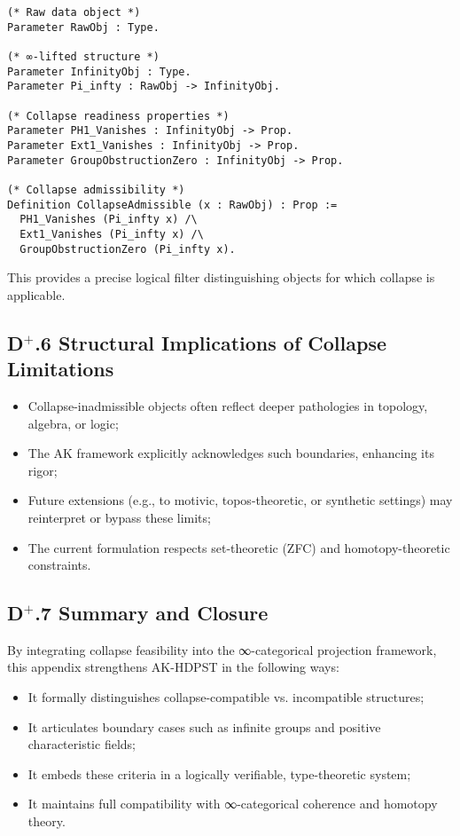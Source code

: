 \documentclass[11pt]{article}
\begin{document}
\begin{lstlisting}[language=Coq, mathescape=false]
(* Raw data object *)
Parameter RawObj : Type.

(* ∞-lifted structure *)
Parameter InfinityObj : Type.
Parameter Pi_infty : RawObj -> InfinityObj.

(* Collapse readiness properties *)
Parameter PH1_Vanishes : InfinityObj -> Prop.
Parameter Ext1_Vanishes : InfinityObj -> Prop.
Parameter GroupObstructionZero : InfinityObj -> Prop.

(* Collapse admissibility *)
Definition CollapseAdmissible (x : RawObj) : Prop :=
  PH1_Vanishes (Pi_infty x) /\
  Ext1_Vanishes (Pi_infty x) /\
  GroupObstructionZero (Pi_infty x).
\end{lstlisting}


This provides a precise logical filter distinguishing objects for which collapse is applicable.

\subsection*{D$^{+}$.6 Structural Implications of Collapse Limitations}

\begin{itemize}
\item Collapse-inadmissible objects often reflect deeper pathologies in topology, algebra, or logic;
\item The AK framework explicitly acknowledges such boundaries, enhancing its rigor;
\item Future extensions (e.g., to motivic, topos-theoretic, or synthetic settings) may reinterpret or bypass these limits;
\item The current formulation respects set-theoretic (ZFC) and homotopy-theoretic constraints.
\end{itemize}

\subsection*{D$^{+}$.7 Summary and Closure}

By integrating collapse feasibility into the ∞-categorical projection framework, this appendix strengthens AK-HDPST in the following ways:

\begin{itemize}
\item It formally distinguishes collapse-compatible vs. incompatible structures;
\item It articulates boundary cases such as infinite groups and positive characteristic fields;
\item It embeds these criteria in a logically verifiable, type-theoretic system;
\item It maintains full compatibility with ∞-categorical coherence and homotopy theory.
\end{itemize}
\end{document}
